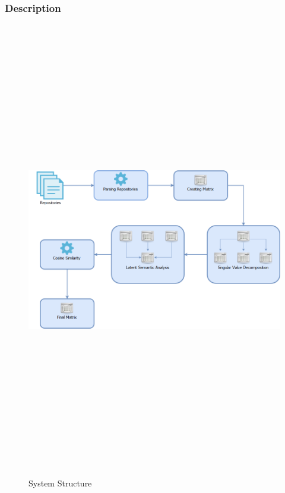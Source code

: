 \clearpage

\subsubsection{Description}
\begin{figure}[H]
\includegraphics[width=15cm,height=20cm,keepaspectratio]{images/Architecture.png}
\caption{System Structure}
\end{figure}

